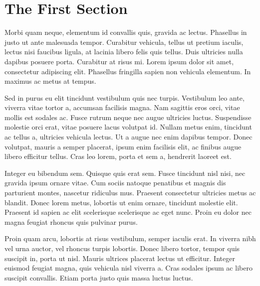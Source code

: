 \documentclass[preprint,12pt]{elsarticle}
\begin{document}
\linenumbers

\section{The First Section}
Morbi quam neque, elementum id convallis quis, gravida ac lectus. Phasellus in justo ut ante malesuada tempor. Curabitur vehicula, tellus ut pretium iaculis, lectus nisi faucibus ligula, at lacinia libero felis quis tellus. Duis ultricies nulla dapibus posuere porta. Curabitur at risus mi. Lorem ipsum dolor sit amet, consectetur adipiscing elit. Phasellus fringilla sapien non vehicula elementum. In maximus ac metus at tempus.

Sed in purus eu elit tincidunt vestibulum quis nec turpis. Vestibulum leo ante, viverra vitae tortor a, accumsan facilisis magna. Nam sagittis eros orci, vitae mollis est sodales ac. Fusce rutrum neque nec augue ultricies luctus. Suspendisse molestie orci erat, vitae posuere lacus volutpat id. Nullam metus enim, tincidunt ac tellus a, ultricies vehicula lectus. Ut a augue nec enim dapibus tempor. Donec volutpat, mauris a semper placerat, ipsum enim facilisis elit, ac finibus augue libero efficitur tellus. Cras leo lorem, porta et sem a, hendrerit laoreet est.

Integer eu bibendum sem. Quisque quis erat sem. Fusce tincidunt nisl nisi, nec gravida ipsum ornare vitae. Cum sociis natoque penatibus et magnis dis parturient montes, nascetur ridiculus mus. Praesent consectetur ultricies metus ac blandit. Donec lorem metus, lobortis ut enim ornare, tincidunt molestie elit. Praesent id sapien ac elit scelerisque scelerisque ac eget nunc. Proin eu dolor nec magna feugiat rhoncus quis pulvinar purus.

Proin quam arcu, lobortis at risus vestibulum, semper iaculis erat. In viverra nibh vel urna auctor, vel rhoncus turpis lobortis. Donec libero tortor, tempor quis suscipit in, porta ut nisl. Mauris ultrices placerat lectus ut efficitur. Integer euismod feugiat magna, quis vehicula nisl viverra a. Cras sodales ipsum ac libero suscipit convallis. Etiam porta justo quis massa luctus luctus.


\end{document}
